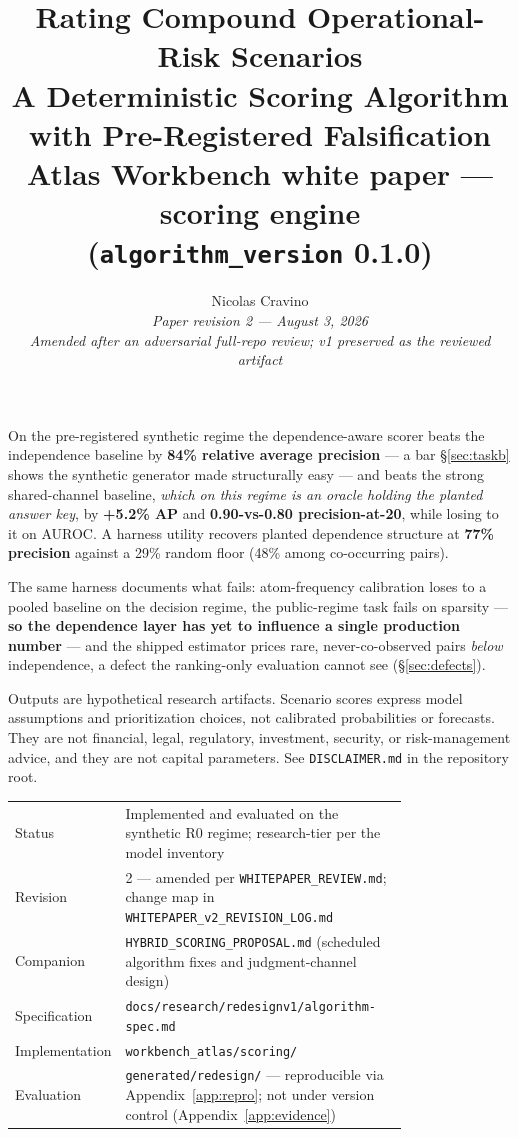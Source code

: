 \documentclass[11pt]{article}
\title{%
  \vspace{-0.5cm}%
  {\color{darkblue}\LARGE\bfseries Rating Compound Operational-Risk Scenarios}\\[6pt]
  {\color{darkred}\Large\bfseries A Deterministic Scoring Algorithm\\ with Pre-Registered Falsification}\\[10pt]
  {\large\normalfont Atlas Workbench white paper --- scoring engine\\
   (\texttt{algorithm\_version} 0.1.0)}
}
\author{%
  Nicolas Cravino\\
  \small\textit{Paper revision 2 --- August 3, 2026}\\[6pt]
  \small\textit{Amended after an adversarial full-repo review; v1 preserved as the reviewed artifact}
}
\date{}
\begin{document}
\maketitle

\begin{tcolorbox}[title=Key Findings --- stated the way a validator would state them]
On the pre-registered synthetic regime the dependence-aware scorer beats the
independence baseline by \textbf{84\% relative average precision} --- a bar
\S\ref{sec:taskb} shows the synthetic generator made structurally easy ---
and beats the strong shared-channel baseline, \emph{which on this regime is
an oracle holding the planted answer key}, by \textbf{+5.2\% AP} and
\textbf{0.90-vs-0.80 precision-at-20}, while losing to it on AUROC. A
harness utility recovers planted dependence structure at \textbf{77\%
precision} against a 29\% random floor (48\% among co-occurring pairs).

The same harness documents what fails: atom-frequency calibration loses to a
pooled baseline on the decision regime, the public-regime task fails on
sparsity --- \textbf{so the dependence layer has yet to influence a single
production number} --- and the shipped estimator prices rare,
never-co-observed pairs \emph{below} independence, a defect the ranking-only
evaluation cannot see (\S\ref{sec:defects}).
\end{tcolorbox}

\begin{tcolorbox}[title=Disclaimer, colframe=darkred, colback=red!4]
Outputs are hypothetical research artifacts. Scenario scores express model
assumptions and prioritization choices, not calibrated probabilities or
forecasts. They are not financial, legal, regulatory, investment, security,
or risk-management advice, and they are not capital parameters. See
\texttt{DISCLAIMER.md} in the repository root.
\end{tcolorbox}

\begin{center}\small
\begin{tabular}{@{}lp{0.78\linewidth}@{}}
\toprule
Status & Implemented and evaluated on the synthetic R0 regime; research-tier per the model inventory \\
Revision & 2 --- amended per \texttt{WHITEPAPER\_REVIEW.md}; change map in \texttt{WHITEPAPER\_v2\_REVISION\_LOG.md} \\
Companion & \texttt{HYBRID\_SCORING\_PROPOSAL.md} (scheduled algorithm fixes and judgment-channel design) \\
Specification & \texttt{docs/research/redesignv1/algorithm-spec.md} \\
Implementation & \texttt{workbench\_atlas/scoring/} \\
Evaluation & \texttt{generated/redesign/} --- reproducible via Appendix~\ref{app:repro}; not under version control (Appendix~\ref{app:evidence}) \\
\bottomrule
\end{tabular}
\end{center}
\end{document}
